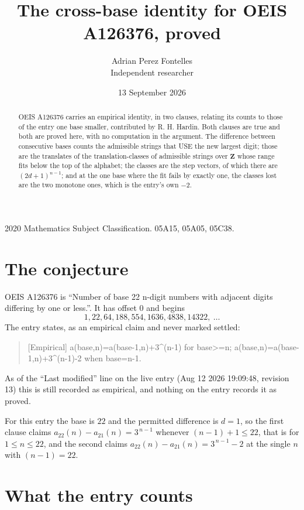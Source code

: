 \documentclass[11pt,a4paper]{article}
\title{The cross-base identity for OEIS A126376, proved}
\author{Adrian Perez Fontelles\\ \small Independent researcher}
\date{13 September 2026}
\theoremstyle{plain}
\theoremstyle{definition}
\begin{document}
\maketitle

\begin{abstract}
OEIS A126376 carries an empirical identity, in two clauses, relating its counts to those of the
entry one base smaller, contributed by R. H. Hardin. Both clauses are true and both are proved
here, with no computation in the argument. The difference between consecutive bases counts the
admissible strings that USE the new largest digit; those are the translates of the
translation-classes of admissible strings over $\mathbf{Z}$ whose range fits below the top of
the alphabet; the classes are the step vectors, of which there are $(2d+1)^{n-1}$; and at the
one base where the fit fails by exactly one, the classes lost are the two monotone ones, which
is the entry's own $-2$.
\end{abstract}

\noindent\small 2020 Mathematics Subject Classification. 05A15, 05A05, 05C38.\normalsize

\section{The conjecture}

OEIS A126376 is ``Number of base 22 n-digit numbers with adjacent digits differing by one or less.''. It has offset $0$ and begins
\[
1, 22, 64, 188, 554, 1636, 4838, 14322,\ \dots
\]
The entry states, as an empirical claim and never marked settled:
\begin{quote}
[Empirical] a(base,n)=a(base-1,n)+3\textasciicircum{}(n-1) for base>=n; a(base,n)=a(base-1,n)+3\textasciicircum{}(n-1)-2 when base=n-1.
\end{quote}
As of the ``Last modified'' line on the live entry (Aug 12 2026 19:09:48, revision 13)
this is still recorded as empirical, and nothing on the entry records it as proved.

For this entry the base is $22$ and the permitted difference is $d=1$, so the first clause
claims $a_{22}(n)-a_{21}(n)=3^{\,n-1}$ whenever $(n-1)+1\le22$, that is for
$1\le n\le22$, and the second claims $a_{22}(n)-a_{21}(n)=3^{\,n-1}-2$ at the single
$n$ with $(n-1)=22$.

\section{What the entry counts}
\end{document}
